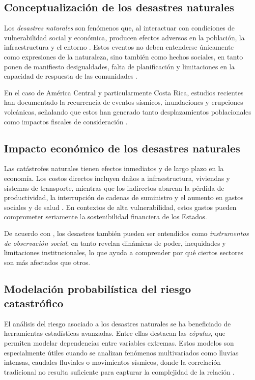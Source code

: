 \documentclass[12pt, a4paper]{article}
\begin{document}
\subsection*{Conceptualización de los desastres naturales}
Los \textit{desastres naturales} son fenómenos que, al interactuar con condiciones de vulnerabilidad social y económica, producen efectos adversos en la población, la infraestructura y el entorno \cite{Paniagua1995}. Estos eventos no deben entenderse únicamente como expresiones de la naturaleza, sino también como hechos sociales, en tanto ponen de manifiesto desigualdades, falta de planificación y limitaciones en la capacidad de respuesta de las comunidades \cite{PerezMallaina2005}.  

En el caso de América Central y particularmente Costa Rica, estudios recientes han documentado la recurrencia de eventos sísmicos, inundaciones y erupciones volcánicas, señalando que estos han generado tanto desplazamientos poblacionales como impactos fiscales de consideración \cite{CentenoMorales2017,OrozcoMontoya2022}.  

\subsection*{Impacto económico de los desastres naturales}
Las catástrofes naturales tienen efectos inmediatos y de largo plazo en la economía. Los costos directos incluyen daños a infraestructura, viviendas y sistemas de transporte, mientras que los indirectos abarcan la pérdida de productividad, la interrupción de cadenas de suministro y el aumento en gastos sociales y de salud \cite{Paniagua1995}. En contextos de alta vulnerabilidad, estos gastos pueden comprometer seriamente la sostenibilidad financiera de los Estados.  

De acuerdo con \cite{PerezMallaina2005}, los desastres también pueden ser entendidos como \textit{instrumentos de observación social}, en tanto revelan dinámicas de poder, inequidades y limitaciones institucionales, lo que ayuda a comprender por qué ciertos sectores son más afectados que otros.  

\subsection*{Modelación probabilística del riesgo catastrófico}
El análisis del riesgo asociado a los desastres naturales se ha beneficiado de herramientas estadísticas avanzadas. Entre ellas destacan las \textit{cópulas}, que permiten modelar dependencias entre variables extremas. Estos modelos son especialmente útiles cuando se analizan fenómenos multivariados como lluvias intensas, caudales fluviales o movimientos sísmicos, donde la correlación tradicional no resulta suficiente para capturar la complejidad de la relación \cite{patton2012review, krupskii2013factor}.  
\end{document}
